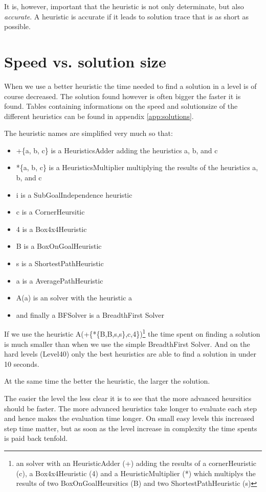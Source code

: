 It is, however, important that the heuristic is not only determinate,
but also \emph{accurate}. A heuristic is accurate if it leads to
solution trace that is as short as possible.



\section{Speed vs. solution size}
When we use a better heuristic the time needed to find a solution in a level is of course decreased. The solution found however is often bigger the faster it is found. Tables containing informations on the speed and solutionsize of the different heuristics can be found in appendix \ref{app:solutions}.

The heuristic names are simplified very much so that:
\begin{itemize}
\item +\{a, b, c\} is a HeuristicsAdder adding the heuristics a, b, and c
\item *\{a, b, c\} is a HeuristicsMultiplier multiplying the results of the heuristics a, b, and c
\item i is a SubGoalIndependence heuristic
\item c is a CornerHeursitic
\item 4 is a Box4x4Heuristic
\item B is a BoxOnGoalHeuristic
\item s is a ShortestPathHeuristic
\item a is a AveragePathHeuristic
\item A(a) is an \astar solver with the heuristic a
\item and finally a BFSolver is a BreadthFirst Solver
\end{itemize}

If we use the heuristic A(+\{*\{B,B,s,s\},c,4\})\footnote{an \astar solver with an HeuristicAdder (+) adding the results of a cornerHeuristic (c), a Box4x4Heuristic (4) and a HeuristicMultiplier (*) which multiplys the results of two BoxOnGoalHeursitics (B) and two ShortestPathHeuristic (s)} the time spent on finding a solution is much smaller than when we use the simple BreadthFirst Solver. And on the hard levels (Level40) only the best heuristics are able to find a solution in under 10 seconds.

At the same time the better the heuristic, the larger the solution.

The easier the level the less clear it is to see that the more advanced heursitics should be faster. The more advanced heuristics take longer to evaluate each step and hence makes the evaluation time longer. On small easy levels this increased step time matter, but as soon as the level increase in complexity the time spents is paid back tenfold.

